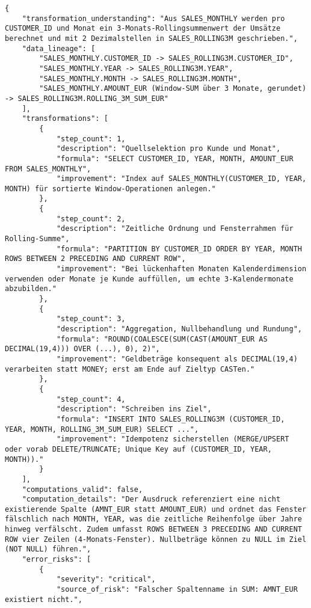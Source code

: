 \begin{lstlisting}[caption={Ausgabe: GPT-5 Anwendungsfall 8 Hauptdurchlauf},label={gpt_case8_prompt1}]
{
    "transformation_understanding": "Aus SALES_MONTHLY werden pro CUSTOMER_ID und Monat ein 3-Monats-Rollingsummenwert der Umsätze berechnet und mit 2 Dezimalstellen in SALES_ROLLING3M geschrieben.",
    "data_lineage": [
        "SALES_MONTHLY.CUSTOMER_ID -> SALES_ROLLING3M.CUSTOMER_ID",
        "SALES_MONTHLY.YEAR -> SALES_ROLLING3M.YEAR",
        "SALES_MONTHLY.MONTH -> SALES_ROLLING3M.MONTH",
        "SALES_MONTHLY.AMOUNT_EUR (Window-SUM über 3 Monate, gerundet) -> SALES_ROLLING3M.ROLLING_3M_SUM_EUR"
    ],
    "transformations": [
        {
            "step_count": 1,
            "description": "Quellselektion pro Kunde und Monat",
            "formula": "SELECT CUSTOMER_ID, YEAR, MONTH, AMOUNT_EUR FROM SALES_MONTHLY",
            "improvement": "Index auf SALES_MONTHLY(CUSTOMER_ID, YEAR, MONTH) für sortierte Window-Operationen anlegen."
        },
        {
            "step_count": 2,
            "description": "Zeitliche Ordnung und Fensterrahmen für Rolling-Summe",
            "formula": "PARTITION BY CUSTOMER_ID ORDER BY YEAR, MONTH ROWS BETWEEN 2 PRECEDING AND CURRENT ROW",
            "improvement": "Bei lückenhaften Monaten Kalenderdimension verwenden oder Monate je Kunde auffüllen, um echte 3-Kalendermonate abzubilden."
        },
        {
            "step_count": 3,
            "description": "Aggregation, Nullbehandlung und Rundung",
            "formula": "ROUND(COALESCE(SUM(CAST(AMOUNT_EUR AS DECIMAL(19,4))) OVER (...), 0), 2)",
            "improvement": "Geldbeträge konsequent als DECIMAL(19,4) verarbeiten statt MONEY; erst am Ende auf Zieltyp CASTen."
        },
        {
            "step_count": 4,
            "description": "Schreiben ins Ziel",
            "formula": "INSERT INTO SALES_ROLLING3M (CUSTOMER_ID, YEAR, MONTH, ROLLING_3M_SUM_EUR) SELECT ...",
            "improvement": "Idempotenz sicherstellen (MERGE/UPSERT oder vorab DELETE/TRUNCATE; Unique Key auf (CUSTOMER_ID, YEAR, MONTH))."
        }
    ],
    "computations_valid": false,
    "computation_details": "Der Ausdruck referenziert eine nicht existierende Spalte (AMNT_EUR statt AMOUNT_EUR) und ordnet das Fenster fälschlich nach MONTH, YEAR, was die zeitliche Reihenfolge über Jahre hinweg verfälscht. Zudem umfasst ROWS BETWEEN 3 PRECEDING AND CURRENT ROW vier Zeilen (4-Monats-Fenster). Nullbeträge können zu NULL im Ziel (NOT NULL) führen.",
    "error_risks": [
        {
            "severity": "critical",
            "source_of_risk": "Falscher Spaltenname in SUM: AMNT_EUR existiert nicht.",

\end{lstlisting}
